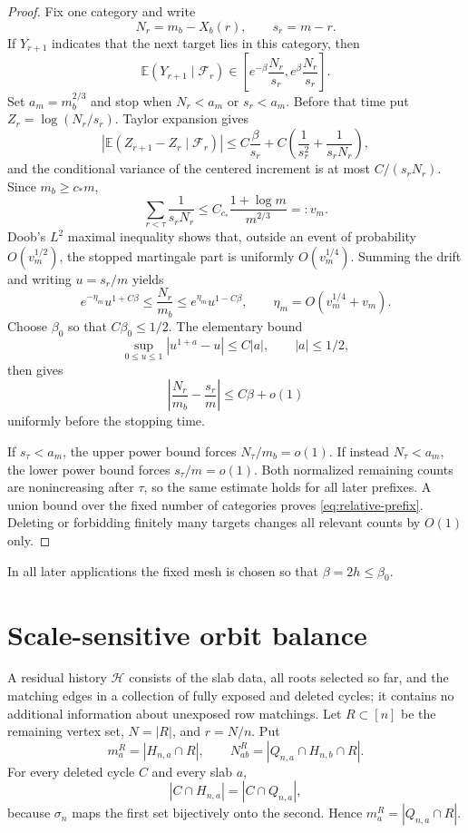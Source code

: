 \documentclass[11pt]{article}
\theoremstyle{definition}
\theoremstyle{remark}
\newcommand{\Ee}{\mathbb E}
\newcommand{\cH}{\mathcal H}
\begin{document}
\begin{proof}
Fix one category and write
\[
 N_r=m_b-X_b(r),\qquad s_r=m-r.
\]
If $Y_{r+1}$ indicates that the next target lies in this category, then
\begin{equation}
 \Ee(Y_{r+1}\mid\mathscr F_r)
 \in\left[e^{-\beta}\frac{N_r}{s_r},
          e^\beta\frac{N_r}{s_r}\right].
 \label{eq:prefix-drift-prob}
\end{equation}
Set $a_m=m_b^{2/3}$ and stop when $N_r<a_m$ or $s_r<a_m$.  Before that time
put $Z_r=\log(N_r/s_r)$.  Taylor expansion gives
\[
 \left|\Ee(Z_{r+1}-Z_r\mid\mathscr F_r)\right|
 \le C\frac\beta{s_r}
    +C\left(\frac1{s_r^2}+\frac1{s_rN_r}\right),
\]
and the conditional variance of the centered increment is at most
$C/(s_rN_r)$.  Since $m_b\ge c_*m$,
\[
 \sum_{r<\tau}\frac1{s_rN_r}
 \le C_{c_*}\frac{1+\log m}{m^{2/3}}=:v_m.
\]
Doob's $L^2$ maximal inequality shows that, outside an event of probability
$O(v_m^{1/2})$, the stopped martingale part is uniformly
$O(v_m^{1/4})$.  Summing the drift and writing $u=s_r/m$ yields
\[
 e^{-\eta_m}u^{1+C\beta}
 \le\frac{N_r}{m_b}
 \le e^{\eta_m}u^{1-C\beta},
 \qquad
 \eta_m=O(v_m^{1/4}+v_m).
\]
Choose $\beta_0$ so that $C\beta_0\le1/2$.  The elementary bound
\[
 \sup_{0\le u\le1}|u^{1+a}-u|\le C|a|,
 \qquad |a|\le1/2,
\]
then gives
\[
 \left|\frac{N_r}{m_b}-\frac{s_r}{m}\right|
 \le C\beta+o(1)
\]
uniformly before the stopping time.

If $s_\tau<a_m$, the upper power bound forces $N_\tau/m_b=o(1)$.  If instead
$N_\tau<a_m$, the lower power bound forces $s_\tau/m=o(1)$.  Both normalized
remaining counts are nonincreasing after $\tau$, so the same estimate holds for
all later prefixes.  A union bound over the fixed number of categories proves
\eqref{eq:relative-prefix}.  Deleting or forbidding finitely many targets
changes all relevant counts by $O(1)$ only.
\end{proof}

In all later applications the fixed mesh is chosen so that
$\beta=2h\le\beta_0$.

\section{Scale-sensitive orbit balance}
\label{sec:orbit-balance}

A residual history $\cH$ consists of the slab data, all roots selected so far,
and the matching edges in a collection of fully exposed and deleted cycles; it
contains no additional information about unexposed row matchings.  Let
$R\subset[n]$ be the remaining vertex set, $N=|R|$, and $r=N/n$.  Put
\[
 m_a^R=|H_{n,a}\cap R|,
 \qquad
 N_{ab}^R=|Q_{n,a}\cap H_{n,b}\cap R|.
\]
For every deleted cycle $C$ and every slab $a$,
\begin{equation}
 |C\cap H_{n,a}|=|C\cap Q_{n,a}|,
 \label{eq:cycle-row-balance}
\end{equation}
because $\sigma_n$ maps the first set bijectively onto the second.  Hence
$m_a^R=|Q_{n,a}\cap R|$.
\end{document}
